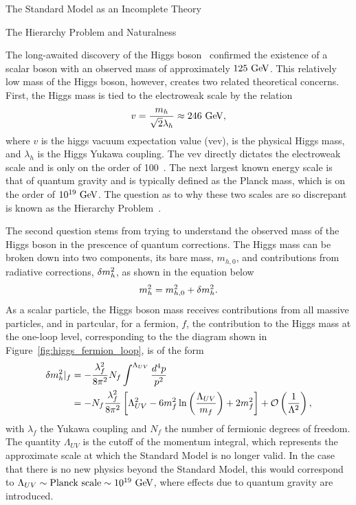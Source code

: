 \begin{section}{The Standard Model as an Incomplete Theory}
\begin{subsection}{The Hierarchy Problem and Naturalness}

The long-awaited discovery of the Higgs boson~\cite{Aad:2012tfa,Chatrchyan:2012xdj,Chatrchyan:2013lba,Khachatryan:2014jba,Aad:2014aba,Aad:2015zhl} confirmed the existence of a scalar boson with an observed mass of approximately $125~\mathrm{Ge\kern -0.1em V}$.
This relatively low mass of the Higgs boson, however, creates two related theoretical concerns.
First, the Higgs mass is tied to the electroweak scale by the relation 
\begin{align}
v = \frac{m_{h}}{\sqrt{2}\lambda_h} \approx 246~\mathrm{Ge\kern -0.1em V},
\end{align}
where $v$ is the higgs vacuum expectation value (vev), \mh is the physical Higgs mass, and $\lambda_h$ is the Higgs Yukawa coupling.
The vev directly dictates the electroweak scale and is only on the order of 100~\GeV.
The next largest known energy scale is that of quantum gravity and is typically defined as the Planck mass, which is on the order of $10^{19}~\mathrm{Ge\kern -0.1em V}$.
The question as to why these two scales are so discrepant is known as the Hierarchy Problem~\cite{Barbieri:1987fn}.

The second question stems from trying to understand the observed mass of the Higgs boson in the prescence of quantum corrections.
The Higgs mass can be broken down into two components, its bare mass, $m_{h,0}$, and contributions from radiative corrections, $\delta m_{h}^2$, as shown in the equation below
\begin{align}
m_{h}^2 = m_{h,0}^2 + \delta m_{h}^2.
\end{align}
As a scalar particle, the Higgs boson mass receives contributions from all massive particles, and in partcular, for a fermion, $f$, the contribution to the Higgs mass at the one-loop level, corresponding to the the diagram shown in Figure~\ref{fig:higgs_fermion_loop}, is of the form
\begin{align}
\delta m_{h}^2|_f &= -\frac{\lambda^2_f}{8\pi^2}N_f \int^{\Lambda_{UV}} \frac{d^4p}{p^2} \nonumber \\
                &= -N_f\frac{\lambda^2_f}{8\pi^2 } \left[\Lambda^2_{UV} - 6m_f^2\ln\left(\frac{\Lambda_{UV}}{m_f}\right) + 2m_f^2\right] + \mathcal{O}\left(\frac{1}{\Lambda^2}\right),
\label{eqn:higgs_fermion_correction}
\end{align}
with $\lambda_f$ the Yukawa coupling and $N_f$ the number of fermionic degrees of freedom.
The quantity $\Lambda_{UV}$ is the cutoff of the momentum integral, which represents the approximate scale at which the Standard Model is no longer valid.
In the case that there is no new physics beyond the Standard Model, this would correspond to $\Lambda_{UV} \sim \text{Planck scale} \sim 10^{19}~\mathrm{Ge\kern -0.1em V}$, where effects due to quantum gravity are introduced.


\end{subsection}
\end{section}
